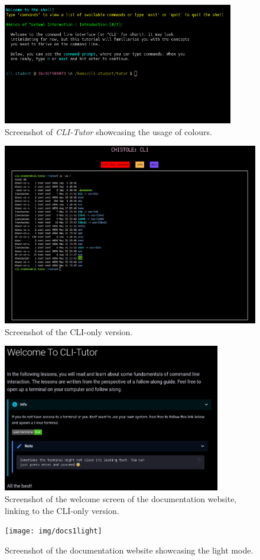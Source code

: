 \begin{figure}[htbp]
	\centering
	\includegraphics[width=0.9\textwidth]{img/lesson1.1}
	\caption{Screenshot of \textit{CLI-Tutor} showcasing the usage of colours.}
	\label{fig:colours}
\end{figure}

\begin{figure}[htbp]
	\centering
	\includegraphics[width=1\textwidth]{img/clionly}
	\caption{Screenshot of the CLI-only version.}
	\label{fig:welcomedocs}
\end{figure}
\begin{figure}[htbp]
	\centering
	\includegraphics[width=0.85\textwidth]{img/docswelcomedark}
	\caption{Screenshot of the welcome screen of the documentation website, linking to the CLI-only version.}
	\label{fig:cliversion}
\end{figure}

\begin{figure}[htbp]
	\centering
	\texttt{[image: img/docs1light]}
	\caption{Screenshot of the documentation website showcasing the light mode.}
	\label{fig:docsweb}
\end{figure}
